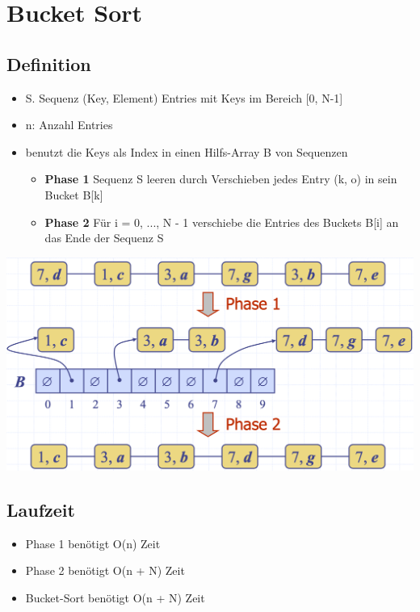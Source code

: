 \section{Bucket Sort}
\subsection{Definition}
\begin{itemize}
    \item S. Sequenz (Key, Element) Entries mit Keys im Bereich [0, N-1]
    \item n: Anzahl Entries
    \item benutzt die Keys als Index in einen Hilfs-Array B von Sequenzen
    \begin{itemize}
        \item \textbf{Phase 1} Sequenz S leeren durch Verschieben jedes Entry (k, o) in sein Bucket B[k]
        \item \textbf{Phase 2} Für i = 0, ..., N - 1 verschiebe die Entries des Buckets B[i] an das Ende der Sequenz S
    \end{itemize}
\end{itemize}
\vspace{-8pt}
\begin{center}
    \includegraphics[scale=.22]{graphic/07 RadixSort/bucket.png}
\end{center}
\vspace{-8pt}

\subsection{Laufzeit}
\begin{itemize}
    \item Phase 1 benötigt O(n) Zeit
    \item Phase 2 benötigt O(n + N) Zeit
    \item Bucket-Sort benötigt O(n + N) Zeit
\end{itemize}

